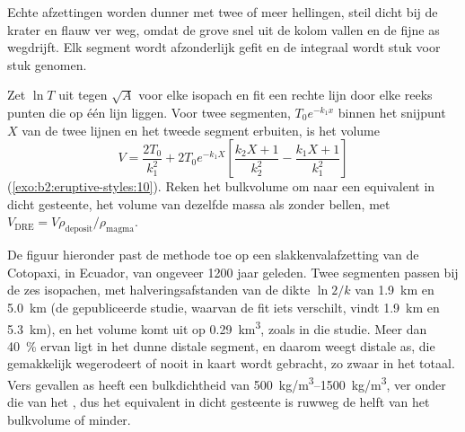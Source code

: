 Echte afzettingen worden dunner met twee of meer hellingen, steil dicht bij de krater en flauw ver
weg, omdat de grove  snel uit de kolom vallen en de fijne as
wegdrijft. Elk segment wordt afzonderlijk gefit en de integraal wordt stuk voor
stuk genomen.

\begin{method}\label{met:b2:eruptive-styles:volume}
Zet $\ln T$ uit tegen $\sqrt A$ voor elke isopach en fit een rechte lijn door elke
reeks punten die op één lijn liggen. Voor twee segmenten, $T_0e^{-k_1x}$ binnen het snijpunt
$X$ van de twee lijnen en het tweede segment erbuiten, is het volume
\[
V = \frac{2T_0}{k_1^2} + 2T_0e^{-k_1X}\left[\frac{k_2X + 1}{k_2^2} -
\frac{k_1X + 1}{k_1^2}\right]
\]
(\cref{exo:b2:eruptive-styles:10}). Reken het bulkvolume om naar een equivalent in dicht gesteente, het volume van
dezelfde massa als  zonder bellen, met $V_{\mathrm{DRE}} = V\rho_{\mathrm{deposit}}/\rho_{\mathrm{magma}}$.
\end{method}

De figuur hieronder past de methode toe op een slakkenvalafzetting van de Cotopaxi, in
Ecuador, van ongeveer \num{1200} jaar geleden. Twee segmenten passen bij de zes isopachen, met
halveringsafstanden van de dikte $\ln 2/k$ van \qty{1.9}{km} en \qty{5.0}{km} (de
gepubliceerde studie, waarvan de fit iets verschilt, vindt \qty{1.9}{km} en
\qty{5.3}{km}), en het volume komt uit op \qty{0.29}{km^3}, zoals in die studie. Meer dan
\qty{40}{\percent} ervan ligt in het dunne distale segment, en daarom weegt distale as,
die gemakkelijk wegerodeert of nooit in kaart wordt gebracht, zo zwaar in het totaal. Vers gevallen as
heeft een bulkdichtheid van \qtyrange{500}{1500}{kg/m^3}, ver onder die van het
, dus het equivalent in dicht gesteente is ruwweg de helft van het bulkvolume of minder.

